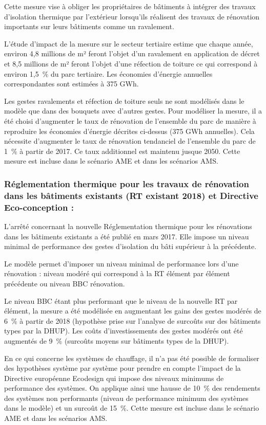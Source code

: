 \documentclass[10.5pt,a4paper]{article}
\begin{document}
{Cette mesure vise à obliger les propriétaires de bâtiments à intégrer des travaux d'isolation thermique par l'extérieur lorsqu'ils réalisent des travaux de rénovation importants sur leurs bâtiments comme un ravalement. 

L’étude d’impact de la mesure sur le secteur tertiaire estime que chaque année, environ 4,8 millions de m² feront l’objet d’un ravalement en application de décret et 8,5 millions de m² feront l’objet d’une réfection de toiture ce qui correspond à environ 1,5~\%  du parc tertiaire. Les économies d’énergie annuelles correspondantes sont estimées à 375 GWh. 

Les gestes ravalements et réfection de toiture seuls ne sont modélisés dans le modèle que dans des bouquets avec d’autres gestes. Pour modéliser la mesure, il a été choisi d’augmenter le taux de rénovation de l’ensemble du parc de manière à reproduire les économies d’énergie décrites ci-dessus (375 GWh annuelles). Cela nécessite d’augmenter le taux de rénovation tendanciel de l’ensemble du parc de 1~\% à partir de 2017. Ce taux additionnel est maintenu jusque 2050. Cette mesure est incluse dans le scénario AME et dans les scénarios AMS. 

\subsubsection{Réglementation thermique pour les travaux de rénovation dans les bâtiments existants (RT existant 2018) et Directive Eco-conception :}

L’arrêté concernant la nouvelle Réglementation thermique pour les rénovations dans les bâtiments existants a été publié en mars 2017. Elle impose un niveau minimal de performance des gestes d'isolation du bâti supérieur à la précédente.

Le modèle permet d’imposer un niveau minimal de performance lors d’une rénovation : niveau modéré qui correspond à la RT élément par élément précédente ou niveau BBC rénovation. 

Le niveau BBC étant plus performant que le niveau de la nouvelle RT par élément, la mesure a été modélisée en augmentant les gains des gestes modérés de 6~\%  à partir de 2018 (hypothèse prise sur l’analyse de surcoûts sur des bâtiments types par la DHUP). Les coûts d’investissements des gestes modérés ont été augmentés de 9~\%  (surcoûts moyens sur bâtiments types de la DHUP). 

En ce qui concerne les systèmes de chauffage, il n’a pas été possible de formaliser des hypothèses système par système pour prendre en compte l'impact de la Directive européenne Ecodesign qui impose des niveaux minimums de performance des systèmes. On applique ainsi une hausse de 10~\%  des rendements des systèmes non performants (niveau de performance minimum des systèmes dans le modèle) et un surcoût de 15~\%. Cette mesure est incluse dans le scénario AME et dans les scénarios AMS. 

}
\end{document}
